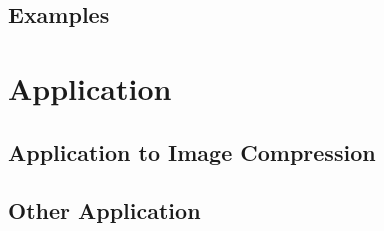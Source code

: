 \documentclass{article}
\begin{document}
\subsection{Examples}

\section{Application}
\subsection{Application to Image Compression}

\subsection{Other Application}
\end{document}
